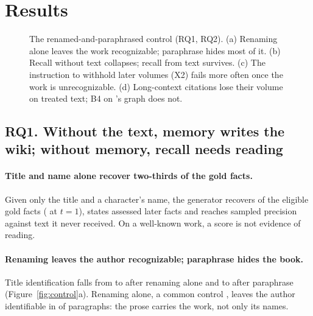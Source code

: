 \section{Results}
\label{sec:results}

\begin{figure}[t]
\centering
\resizebox{\textwidth}{!}{}
\caption{The renamed-and-paraphrased control (RQ1, RQ2). (a) Renaming alone leaves the
work recognizable; paraphrase hides most of it. (b) Recall without text collapses; recall
from text survives. (c) The instruction to withhold later volumes (X2) fails more often once
the work is unrecognizable. (d) Long-context citations lose their volume on treated text; B4
on \sys's graph does not.}
\label{fig:control}\label{fig:deconrecall}
\end{figure}

\subsection{RQ1. Without the text, memory writes the wiki; without memory, recall needs reading}
\label{sec:results-decon}

\paragraph{Title and name alone recover two-thirds of the gold facts.}
Given only the title and a character's name, the generator recovers
 of the eligible gold facts ( at $t=1$), states
 assessed later facts and reaches sampled precision
 against text it never received. On a well-known work, a score is
not evidence of reading.

\paragraph{Renaming leaves the author recognizable; paraphrase hides the book.}
Title identification falls from  to  after
renaming alone and to  after paraphrase (Figure~\ref{fig:control}a).
Renaming alone, a common control \citep{gupta2025whodunit,zhang2024infinitebench}, leaves
the author identifiable in  of paragraphs: the prose carries the work,
not only its names.

